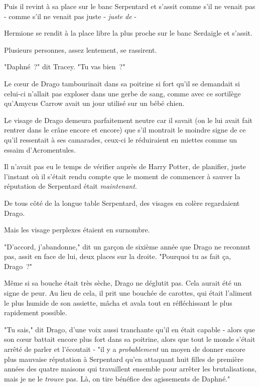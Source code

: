 Puis il revint à sa place sur le banc Serpentard et s'assit comme s'il ne venait pas - comme s'il ne venait pas juste - \emph{juste de} -

Hermione se rendit à la place libre la plus proche sur le banc Serdaigle et s'assit.

Plusieurs personnes, assez lentement, se rassirent.

"Daphné~?" dit Tracey. "Tu vas bien~?"

\later

Le cœur de Drago tambourinait dans sa poitrine si fort qu'il se demandait si celui-ci n'allait pas exploser dans une gerbe de sang, comme avec ce sortilège qu'Amycus Carrow avait un jour utilisé sur un bébé chien.

Le visage de Drago demeura parfaitement neutre car il savait (on le lui avait fait rentrer dans le crâne encore et encore) que s'il montrait le moindre signe de ce qu'il ressentait à ses camarades, ceux-ci le réduiraient en miettes comme un essaim d'Acromentules.

Il n'avait pas eu le temps de vérifier auprès de Harry Potter, de planifier, juste l'instant où il s'était rendu compte que le moment de commencer à sauver la réputation de Serpentard était \emph{maintenant}.

De tous côté de la longue table Serpentard, des visages en colère regardaient Drago.

Mais les visage perplexes étaient en surnombre.

"D'accord, j'abandonne," dit un garçon de sixième année que Drago ne reconnut pas, assit en face de lui, deux places sur la droite. "Pourquoi tu as fait ça, Drago~?"

Même si sa bouche était très sèche, Drago ne déglutit pas. Cela aurait été un signe de peur. Au lieu de cela, il prit une bouchée de carottes, qui était l'aliment le plus humide de son assiette, mâcha et avala tout en réfléchissant le plus rapidement possible.

"Tu sais," dit Drago, d'une voix aussi tranchante qu'il en était capable - alors que son cœur battait encore plus fort dans sa poitrine, alors que tout le monde s'était arrêté de parler et l'écoutait - "il y a \emph{probablement} un moyen de donner encore plus mauvaise réputation à Serpentard qu'en attaquant huit filles de première années des quatre maisons qui travaillent ensemble pour arrêter les brutalisations, mais je ne le \emph{trouve} pas. Là, on tire bénéfice des agissements de Daphné."

